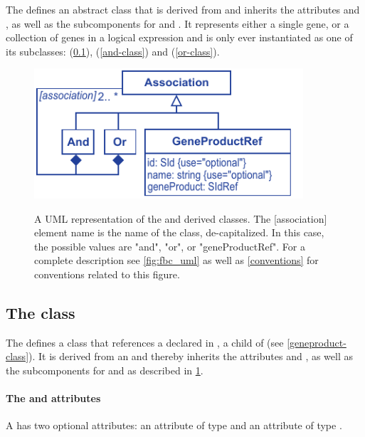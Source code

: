 The \FBCPackage defines an abstract \Association class that is
derived from \SBase and inherits the attributes  and
, as well as the subcomponents for \Annotation and \Notes.
It represents either a single gene, or a collection of genes in a
logical expression and is only ever instantiated as one of its
subclasses: \GeneProductRef (\ref{geneproductref-class}), \GeneAnd
(\ref{and-class}) and \GeneOr (\ref{or-class}).
%
\begin{figure}[ht!]
  \centering
  \includegraphics[width=10cm]{images/v2harmony_fbc_association.pdf}\\
  \caption{A UML representation of the \FBCPackage \Association and derived
	classes. The [association] element name is the name of the class, de-capitalized. In this case, the possible values are "and", "or", or "geneProductRef". For a complete description see \ref{fig:fbc_uml} as well as \ref{conventions} for conventions related to this figure.}
  \label{fig:fbc_uml_ass}
\end{figure}

\subsection{The \FBC {} class}
\label{geneproductref-class}

The \FBCPackage defines a \GeneProductRef class that references
a \GeneProduct declared in \ListOfGeneProducts, a child of
\Model (see \ref{geneproduct-class}). It is derived from an \Association and thereby inherits the \SBase attributes  and , as well as the subcomponents for \Annotation and \Notes as described in \ref{fig:fbc_uml_ass}.

\paragraph{The  and  attributes}
A \GeneProductRef has two optional attributes:  an attribute of
type  and  an attribute of type .

